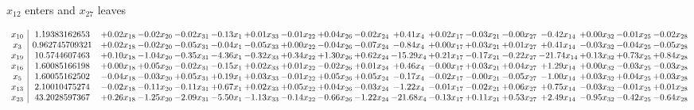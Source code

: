 \documentclass[9pt]{article}
\begin{document}
 $ x_{12} $ enters and $ x_{27} $ leaves 

 \[\begin{array}{c| c c@{\hskip 2pt} c@{\hskip 2pt} c@{\hskip 2pt} c@{\hskip 2pt} c@{\hskip 2pt} c@{\hskip 2pt} c@{\hskip 2pt} c@{\hskip 2pt} c@{\hskip 2pt} c@{\hskip 2pt} c@{\hskip 2pt} c@{\hskip 2pt} c@{\hskip 2pt} c@{\hskip 2pt} c@{\hskip 2pt} c@{\hskip 2pt} }
 x_{10}   &  1.19383162653 & +  0.02 x_{18} & -0.02 x_{20} & -0.02 x_{31} & -0.13 x_{1} & +  0.01 x_{33} & -0.01 x_{22} & +  0.04 x_{26} & -0.02 x_{24} & +  0.41 x_{4} & +  0.02 x_{17} & -0.03 x_{21} & -0.00 x_{27} & -0.42 x_{14} & +  0.00 x_{32} & -0.01 x_{25} & -0.02 x_{28}\\
 x_{3}   &  0.962745709321 & +  0.02 x_{18} & -0.02 x_{20} & -0.05 x_{31} & -0.04 x_{1} & -0.05 x_{33} & +  0.00 x_{22} & -0.04 x_{26} & -0.07 x_{24} & -0.84 x_{4} & +  0.00 x_{17} & +  0.03 x_{21} & +  0.01 x_{27} & +  0.41 x_{14} & -0.03 x_{32} & -0.04 x_{25} & -0.05 x_{28}\\
 x_{19}   &  10.5744607463 & +  0.10 x_{18} & -1.04 x_{20} & -0.35 x_{31} & -4.36 x_{1} & -0.32 x_{33} & +  0.34 x_{22} & +  1.30 x_{26} & +  0.62 x_{24} & -15.29 x_{4} & +  0.21 x_{17} & -0.17 x_{21} & -0.22 x_{27} & -21.74 x_{14} & +  0.13 x_{32} & +  0.73 x_{25} & +  0.84 x_{28}\\
 x_{16}   &  1.60085166198 & +  0.00 x_{18} & +  0.05 x_{20} & -0.02 x_{31} & -0.15 x_{1} & +  0.02 x_{33} & +  0.01 x_{22} & -0.02 x_{26} & +  0.01 x_{24} & +  0.46 x_{4} & -0.00 x_{17} & +  0.03 x_{21} & +  0.04 x_{27} & +  1.29 x_{14} & +  0.00 x_{32} & -0.03 x_{25} & -0.03 x_{28}\\
 x_{5}   &  1.60055162502 & -0.04 x_{18} & -0.03 x_{20} & +  0.05 x_{31} & +  0.19 x_{1} & +  0.03 x_{33} & -0.01 x_{22} & +  0.05 x_{26} & +  0.05 x_{24} & -0.17 x_{4} & -0.02 x_{17} & -0.00 x_{21} & -0.05 x_{27} & -1.00 x_{14} & +  0.03 x_{32} & +  0.04 x_{25} & +  0.03 x_{28}\\
 x_{13}   &  2.10010475274 & -0.02 x_{18} & -0.11 x_{20} & -0.11 x_{31} & +  0.67 x_{1} & +  0.02 x_{33} & +  0.05 x_{22} & +  0.04 x_{26} & -0.03 x_{24} & -1.22 x_{4} & -0.01 x_{17} & -0.02 x_{21} & +  0.06 x_{27} & +  0.75 x_{14} & -0.03 x_{32} & -0.01 x_{25} & +  0.01 x_{28}\\
 x_{23}   &  43.2028597367 & +  0.26 x_{18} & -1.25 x_{20} & -2.09 x_{31} & -5.50 x_{1} & -1.13 x_{33} & -0.14 x_{22} & -0.66 x_{26} & -1.22 x_{24} & -21.68 x_{4} & -0.13 x_{17} & +  0.11 x_{21} & +  0.53 x_{27} & +  2.49 x_{14} & -0.95 x_{32} & -0.42 x_{25} & -0.64 x_{28}\\

\end{array}\]
\end{document}
